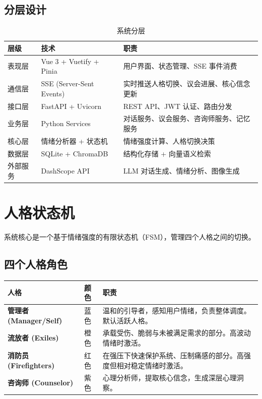 \documentclass[12pt,a4paper]{ctexart}
\begin{document}
\subsection{分层设计}

\begin{table}[htbp]
\centering
\begin{tabular}{@{}llp{7cm}@{}}
\toprule
\textbf{层级} & \textbf{技术} & \textbf{职责} \\
\midrule
表现层 & Vue 3 + Vuetify + Pinia & 用户界面、状态管理、SSE 事件消费 \\
通信层 & SSE (Server-Sent Events) & 实时推送人格切换、议会进展、核心信念更新 \\
接口层 & FastAPI + Uvicorn & REST API、JWT 认证、路由分发 \\
业务层 & Python Services & 对话服务、议会服务、咨询师服务、记忆服务 \\
核心层 & 情绪分析器 + 状态机 & 情绪强度计算、人格切换决策 \\
数据层 & SQLite + ChromaDB & 结构化存储 + 向量语义检索 \\
外部服务 & DashScope API & LLM 对话生成、情绪分析、图像生成 \\
\bottomrule
\end{tabular}
\caption{系统分层}
\end{table}

\section{人格状态机}

系统核心是一个基于情绪强度的有限状态机（FSM），管理四个人格之间的切换。

\subsection{四个人格角色}

\begin{table}[htbp]
\centering
\begin{tabular}{@{}llp{8cm}@{}}
\toprule
\textbf{人格} & \textbf{颜色} & \textbf{职责} \\
\midrule
\textcolor{manager}{\textbf{管理者 (Manager/Self)}} & 蓝色 & 温和的引导者，感知用户情绪，负责整体调度。默认活跃人格。 \\
\textcolor{exilescolor}{\textbf{流放者 (Exiles)}} & 橙色 & 承载受伤、脆弱与未被满足需求的部分。高波动情绪时激活。 \\
\textcolor{firefighters}{\textbf{消防员 (Firefighters)}} & 红色 & 在强压下快速保护系统、压制痛感的部分。高强度但相对稳定情绪时激活。 \\
\textcolor{counselor}{\textbf{咨询师 (Counselor)}} & 紫色 & 心理分析师，提取核心信念，生成深层心理洞察。 \\
\bottomrule
\end{tabular}
\end{table}
\end{document}
